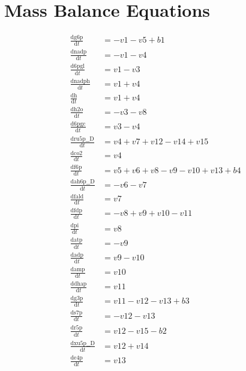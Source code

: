 \documentclass{scrartcl}
\def\dd{\mathrm{d}}
\begin{document}
\section{Mass Balance Equations}
\begin{align}
\frac{\dd \mathrm{g6p}}{\dd t} &=  -v1 -v5 +b1\\
\frac{\dd \mathrm{nadp}}{\dd t} &=  -v1 -v4\\
\frac{\dd \mathrm{6pgl}}{\dd t} &= v1 -v3\\
\frac{\dd \mathrm{nadph}}{\dd t} &= v1 +v4\\
\frac{\dd \mathrm{h}}{\dd t} &= v1 +v4\\
\frac{\dd \mathrm{h2o}}{\dd t} &=  -v3 -v8\\
\frac{\dd \mathrm{6pgc}}{\dd t} &= v3 -v4\\
\frac{\dd \mathrm{ru5p\_\_D}}{\dd t} &= v4 +v7 +v12 -v14 +v15\\
\frac{\dd \mathrm{co2}}{\dd t} &= v4\\
\frac{\dd \mathrm{f6p}}{\dd t} &= v5 +v6 +v8 -v9 -v10 +v13 +b4\\
\frac{\dd \mathrm{ah6p\_\_D}}{\dd t} &=  -v6 -v7\\
\frac{\dd \mathrm{fald}}{\dd t} &= v7\\
\frac{\dd \mathrm{fdp}}{\dd t} &=  -v8 +v9 +v10 -v11\\
\frac{\dd \mathrm{pi}}{\dd t} &= v8\\
\frac{\dd \mathrm{atp}}{\dd t} &=  -v9\\
\frac{\dd \mathrm{adp}}{\dd t} &= v9 -v10\\
\frac{\dd \mathrm{amp}}{\dd t} &= v10\\
\frac{\dd \mathrm{dhap}}{\dd t} &= v11\\
\frac{\dd \mathrm{g3p}}{\dd t} &= v11 -v12 -v13 +b3\\
\frac{\dd \mathrm{s7p}}{\dd t} &=  -v12 -v13\\
\frac{\dd \mathrm{r5p}}{\dd t} &= v12 -v15 -b2\\
\frac{\dd \mathrm{xu5p\_\_D}}{\dd t} &= v12 +v14\\
\frac{\dd \mathrm{e4p}}{\dd t} &= v13\\
\end{align}
\end{document}
